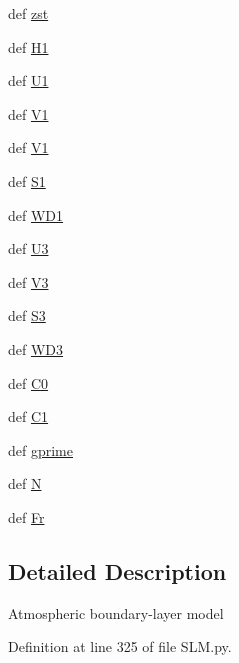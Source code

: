 \begin{DoxyCompactItemize}
\item 
def \hyperlink{classtlmpy_1_1SLM_1_1ABL_a24af9a19364b2232df4705846d3ac7aa}{zst}
\item 
def \hyperlink{classtlmpy_1_1SLM_1_1ABL_abd7ec5234efaa7eb8104f4050510ab1a}{H1}
\item 
def \hyperlink{classtlmpy_1_1SLM_1_1ABL_a6257a0025ae59e5c8c63e2d8e0e2b06b}{U1}
\item 
def \hyperlink{classtlmpy_1_1SLM_1_1ABL_a253d7972ac7b0e2c1e7d7ab6bb4ee36c}{V1}
\item 
def \hyperlink{classtlmpy_1_1SLM_1_1ABL_a253d7972ac7b0e2c1e7d7ab6bb4ee36c}{V1}
\item 
def \hyperlink{classtlmpy_1_1SLM_1_1ABL_a49b686e3e305d0fde48174a907a203e0}{S1}
\item 
def \hyperlink{classtlmpy_1_1SLM_1_1ABL_a7e60a5ae8e06ea0bf3e9c639e23f835d}{WD1}
\item 
def \hyperlink{classtlmpy_1_1SLM_1_1ABL_a6718bd4ccfb951a0ef15e66ed6322176}{U3}
\item 
def \hyperlink{classtlmpy_1_1SLM_1_1ABL_a89b3588e30cdd751766aa6eb5b478d70}{V3}
\item 
def \hyperlink{classtlmpy_1_1SLM_1_1ABL_a5383c931bc8772cd04871b0f88aecbe7}{S3}
\item 
def \hyperlink{classtlmpy_1_1SLM_1_1ABL_a1ab4a0d3969c869955dacc1f0ce7a781}{WD3}
\item 
def \hyperlink{classtlmpy_1_1SLM_1_1ABL_aa4dd635afe05b4a3fa04ae29074fca8c}{C0}
\item 
def \hyperlink{classtlmpy_1_1SLM_1_1ABL_a0f1161eb301426e33545fc845d62b512}{C1}
\item 
def \hyperlink{classtlmpy_1_1SLM_1_1ABL_a12fc941483f473a05a78b81bc1a173be}{gprime}
\item 
def \hyperlink{classtlmpy_1_1SLM_1_1ABL_a604538487a75c47dbd93c7518e58f3f1}{N}
\item 
def \hyperlink{classtlmpy_1_1SLM_1_1ABL_ab2e0608547144f4ff38680a05248c0ce}{Fr}
\end{DoxyCompactItemize}


\subsection{Detailed Description}
\begin{DoxyVerb}

Atmospheric boundary-layer model
\end{DoxyVerb}
 

Definition at line 325 of file SLM.py.

